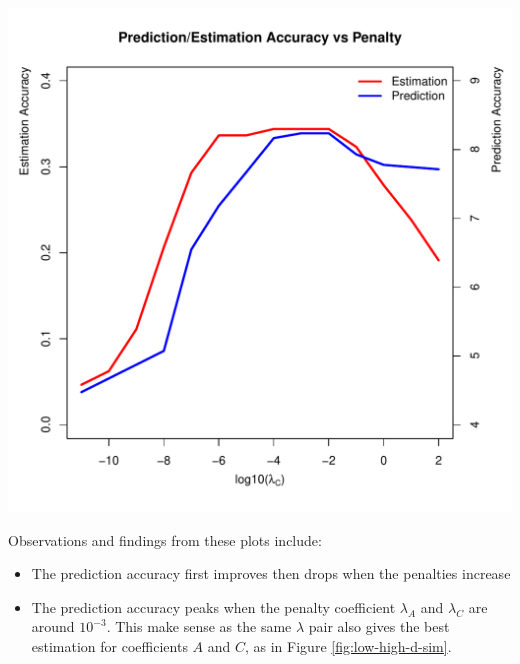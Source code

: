 \documentclass[fleqn]{article}
\let\oldref\ref
\renewcommand{\ref}[1]{(\oldref{#1})}
\newcommand{\mrsid}{{\sc \texttt{Mr}.~\texttt{Sid}}}
\begin{document}
\begin{center}
\includegraphics[scale=0.7]{./figures/est-pred-accuracy.pdf}
\label{fig:estpredaccuracy}
\end{center}


Observations and findings from these plots include:
\begin{itemize}
 \item The prediction accuracy first improves then drops when the penalties increase
 \item The prediction accuracy peaks when the penalty coefficient $\lambda_A$ and $\lambda_C$ are around $10^{-3}$. This make sense as the same $\lambda$ pair also gives the best estimation for coefficients $A$ and $C$, as in Figure \oldref{fig:low-high-d-sim}.
\end{itemize}
\end{document}
